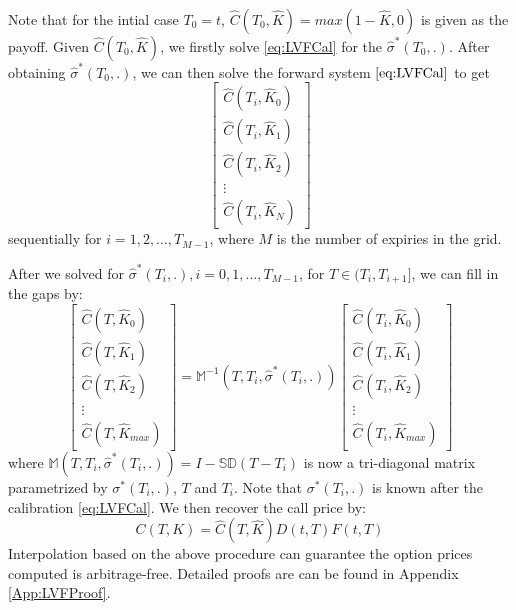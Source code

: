 \documentclass[letterpaper,12pt,titlepage,oneside,final]{book}
\numberwithin{equation}{section}
\theoremstyle{definition}
\begin{document}
Note that for the intial case $T_0=t$, $\widehat{C}(T_0,\widehat{K})=max(1-\widehat{K},0)$ is given as the payoff. Given $\widehat{C}(T_0,\widehat{K})$, we firstly solve \eqref{eq:LVFCal} for the $\widehat{\sigma}^*(T_0,.).$ After obtaining $\widehat{\sigma}^*(T_0,.)$, we can then solve the forward system  $\eqref{eq:LVFCal}$ to get \[
\begin{bmatrix}
\widehat{C}(T_i,\widehat{K}_0)\\
\widehat{C}(T_i,\widehat{K}_1)\\
\widehat{C}(T_i,\widehat{K}_2)\\
\vdots\\
\widehat{C}(T_i,\widehat{K}_{N})
\end{bmatrix}
\] sequentially for $i=1,2,\dots,T_{M-1}$, where $M$ is the number of expiries in the grid.




After we solved for  $\widehat{\sigma}^*(T_i,.), i=0,1,\dots,T_{M-1}$, for $T \in (T_i,T_{i+1}]$, we can fill in the gaps by:
\begin{equation}
\begin{bmatrix}
\widehat{C}(T,\widehat{K}_0)\\
\widehat{C}(T,\widehat{K}_1)\\
\widehat{C}(T,\widehat{K}_2)\\
\vdots\\
\widehat{C}(T,\widehat{K}_{max})
\end{bmatrix}=\mathcal{\mathbb{M}}^{-1} (T,T_{i}, \widehat{\sigma}^*(T_i,.))\begin{bmatrix}
\widehat{C}_{}(T_{i},\widehat{K}_0)\\
\widehat{C}_{}(T_{i},\widehat{K}_1)\\
\widehat{C}_{}(T_{i},\widehat{K}_2)\\
\vdots\\
\widehat{C}_{}(T_{i},\widehat{K}_{max})
\end{bmatrix}
\label{eq:LVFFill}
\end{equation}
where $\mathcal{\mathbb{M}} (T,T_{i}, \widehat{\sigma}^*(T_i,.))=I-\mathcal{\mathbb{S}}\mathcal{\mathbb{D}}(T-T_i)$ is now a tri-diagonal matrix parametrized by  $\sigma^*(T_i,.)$, $T$ and $T_i$. Note that $\sigma^*(T_i,.)$ is known after the calibration \eqref{eq:LVFCal}.
We then recover the call price by:
\[
C(T,K)=\widehat{C}(T,\widehat{K}){D(t,T)F(t,T)}
\]
Interpolation based on the above procedure can guarantee the option prices computed is arbitrage-free. Detailed proofs are can be found in Appendix \ref{App:LVFProof}.
\end{document}
